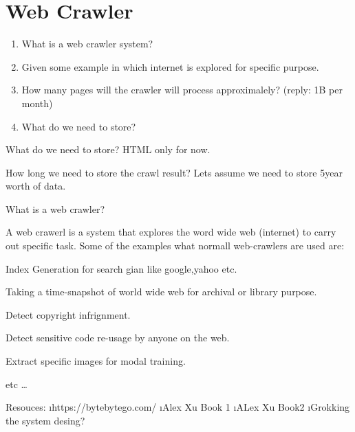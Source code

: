 \documentclass{../latex-setting/cmemoir}
\begin{document}
\tableofcontents


\chapter{Web Crawler}


\begin{exercise}
\begin{enumerate}
    \item What is a web crawler system? 
    \item Given some example in which internet is explored for specific purpose.
    \item How many pages will the crawler will process  approximalely? (reply: 1B per month)
    \item What do we need to store?
    
\end{enumerate}

\end{exercise}

\qicon What do we need to store?
\sicon HTML only for now.

\qicon How long we need to store the crawl result?
\sicon Lets assume we need to store 5year worth of data.



\newpage
\label{answers}
\begin{question}{What is a web crawler?}
   
    A web crawerl is a system that explores the word wide web (internet) to carry out specific task. Some of the examples what normall web-crawlers are used are:
    \begin{compactenum}[(i)]
        \item Index Generation for search gian like google,yahoo etc.
        \item Taking a time-snapshot of world wide web for archival or library purpose.
        \item Detect copyright infrignment.
        \item Detect sensitive code re-usage by anyone on the web.
        \item Extract specific images for modal training.
        \item etc \dots
    \end{compactenum}

\end{question}











Resouces:
\lstart
    \i https://bytebytego.com/
    \i Alex Xu Book 1
    \i ALex Xu Book2
    \i Grokking the system desing?
\lend
\end{document}
